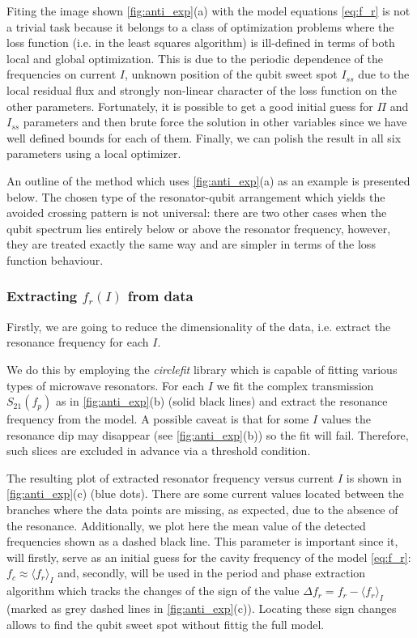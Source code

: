 \documentclass[%
 aip,
 amsmath,amssymb,
 reprint,%
]{revtex4-1}
\begin{document}
Fiting the image shown \autoref{fig:anti_exp}(a) with the model equations \eqref{eq:f_r} is not a trivial task because it belongs to a class of optimization problems where the loss function (i.e. in the least squares algorithm) is ill-defined in terms of both local and global optimization. This is due to the periodic dependence of the frequencies on current $I$, unknown position of the qubit sweet spot $I_{ss}$ due to the local residual flux and strongly non-linear character of the loss function on the other parameters. Fortunately, it is possible to get a good initial guess for $\Pi$ and $I_{ss}$ parameters and then brute force the solution in other variables since we have well defined bounds for each of them. Finally, we can polish the result in all six parameters using a local optimizer.

An outline of the method which uses \autoref{fig:anti_exp}(a) as an example is presented below. The chosen type of the resonator-qubit arrangement which yields the avoided crossing pattern is not universal: there are two other cases when the qubit spectrum lies entirely below or above the resonator frequency, however, they are treated exactly the same way and are simpler in terms of the loss function behaviour.

\subsubsection{Extracting $f_r(I)$ from data}\label{sec:extract_fr}

Firstly, we are going to reduce the dimensionality of the data, i.e. extract the resonance frequency for each $I$.

We do this by employing the \textit{circlefit}\cite{probst2015} library which is capable of fitting various types of microwave resonators. For each $I$ we fit the complex transmission $S_{21}(f_p)$ as in \autoref{fig:anti_exp}(b) (solid black lines) and extract the resonance frequency from the model. A possible caveat is that for some $I$ values the resonance dip may disappear (see \autoref{fig:anti_exp}(b)) so the fit will fail. Therefore, such slices are excluded in advance via a threshold condition.

The resulting plot of extracted resonator frequency versus current $I$ is shown in \autoref{fig:anti_exp}(c) (blue dots). There are some current values located between the branches where the data points are missing, as expected, due to the absence of the resonance. Additionally, we plot here the mean value of the detected frequencies shown as a dashed black line. This parameter is important since it, will firstly, serve as an initial guess for the cavity frequency of the model \eqref{eq:f_r}: $f_c \approx \langle f_r \rangle_{I}$ and, secondly, will be used in the period and phase extraction algorithm which tracks the changes of the sign of the value $\Delta f_r = f_r - \langle f_r \rangle_{I}$ (marked as grey dashed lines in \autoref{fig:anti_exp}(c)). Locating these sign changes allows to find the qubit sweet spot without fittig the full model.
\end{document}
